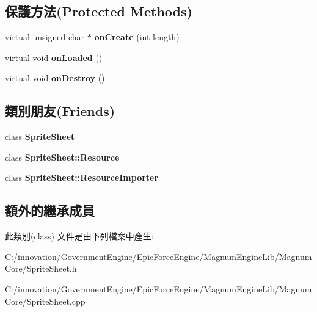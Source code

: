 \subsection*{保護方法(Protected Methods)}
\begin{DoxyCompactItemize}
\item 
virtual unsigned char $\ast$ {\bfseries on\+Create} (int length)\hypertarget{class_i_dream_sky_1_1_sprite_sheet_1_1_resource_a8188433c43334a65d9ecbb91918f8847}{}\label{class_i_dream_sky_1_1_sprite_sheet_1_1_resource_a8188433c43334a65d9ecbb91918f8847}

\item 
virtual void {\bfseries on\+Loaded} ()\hypertarget{class_i_dream_sky_1_1_sprite_sheet_1_1_resource_a59b2d75ccef2ac848755c67c3321218b}{}\label{class_i_dream_sky_1_1_sprite_sheet_1_1_resource_a59b2d75ccef2ac848755c67c3321218b}

\item 
virtual void {\bfseries on\+Destroy} ()\hypertarget{class_i_dream_sky_1_1_sprite_sheet_1_1_resource_a1ab8f27edf3146dc0ad0a4d1237bb87c}{}\label{class_i_dream_sky_1_1_sprite_sheet_1_1_resource_a1ab8f27edf3146dc0ad0a4d1237bb87c}

\end{DoxyCompactItemize}
\subsection*{類別朋友(Friends)}
\begin{DoxyCompactItemize}
\item 
class {\bfseries Sprite\+Sheet}\hypertarget{class_i_dream_sky_1_1_sprite_sheet_1_1_resource_ab43118917ba092ba6289c7ee4cd3e5fd}{}\label{class_i_dream_sky_1_1_sprite_sheet_1_1_resource_ab43118917ba092ba6289c7ee4cd3e5fd}

\item 
class {\bfseries Sprite\+Sheet\+::\+Resource}\hypertarget{class_i_dream_sky_1_1_sprite_sheet_1_1_resource_a8727041c910f9527ea7b20dfac74f485}{}\label{class_i_dream_sky_1_1_sprite_sheet_1_1_resource_a8727041c910f9527ea7b20dfac74f485}

\item 
class {\bfseries Sprite\+Sheet\+::\+Resource\+Importer}\hypertarget{class_i_dream_sky_1_1_sprite_sheet_1_1_resource_a3c6baee866d2819736b4c0a94c9e507c}{}\label{class_i_dream_sky_1_1_sprite_sheet_1_1_resource_a3c6baee866d2819736b4c0a94c9e507c}

\end{DoxyCompactItemize}
\subsection*{額外的繼承成員}


此類別(class) 文件是由下列檔案中產生\+:\begin{DoxyCompactItemize}
\item 
C\+:/innovation/\+Government\+Engine/\+Epic\+Force\+Engine/\+Magnum\+Engine\+Lib/\+Magnum\+Core/Sprite\+Sheet.\+h\item 
C\+:/innovation/\+Government\+Engine/\+Epic\+Force\+Engine/\+Magnum\+Engine\+Lib/\+Magnum\+Core/Sprite\+Sheet.\+cpp\end{DoxyCompactItemize}

